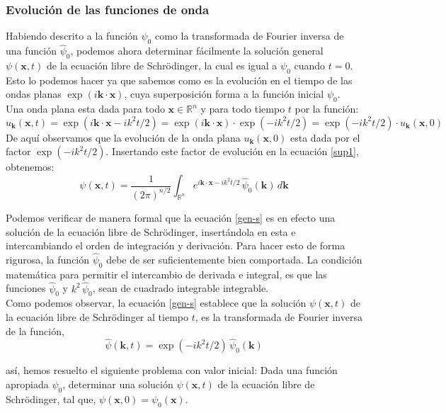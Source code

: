 \documentclass[12pt]{book}
\numberwithin{equation}{chapter}
\def\R{\mathbb{R}}
\def\x{\mathbf{x}}
\def\k{\mathbf{k}}
\begin{document}
\subsubsection{Evoluci\'on de las funciones de onda}
Habiendo descrito a la funci\'on $\psi_{0}$ como la transformada de Fourier inversa de una funci\'on $\hat{\psi}_{0}$, podemos ahora determinar f\'acilmente la soluci\'on general $\psi(\x , t)$ de la ecuaci\'on libre de Schr\"odinger, la cual es igual a $\psi_{0}$ cuando $t=0$. Esto lo podemos hacer ya que sabemos como es la evoluci\'on en el tiempo de las ondas planas $\exp( i \k \cdot \x )$, cuya superposici\'on forma a la funci\'on inicial $\psi_{0}$.\\
Una onda plana esta dada para todo $\x \in \R^{n}$ y para todo tiempo $t$ por la funci\'on:
$$ u_{\k}(\x,t)= \exp ( i \k \cdot \x -i k^{2}t/2  )=\exp(i \k \cdot \x)\cdot \exp(-i k^{2}t/2)= \exp(-i k^{2}t/2)\cdot u_{\k}(\x, 0) $$
De aqu\'i observamos que la evoluci\'on de la onda plana $u_{\k}(\x, 0)$ esta dada por el factor $\exp(-i k^{2}t/2)$. Insertando este factor de evoluci\'on en la ecuaci\'on \eqref{sup1}, obtenemos:
\begin{equation}\label{gen-s}
\psi (\x , t)= \frac{1}{(2 \pi)^{n/2}} \int_{\R^{n}} e^{i\k \cdot \x - ik^{2}t/2}\, \hat{\psi}_{0}(\k)\, d\k
\end{equation}

Podemos verificar de manera formal que la ecuaci\'on \eqref{gen-s} es en efecto una soluci\'on de la ecuaci\'on libre de Schr\"odinger, insert\'andola en esta e intercambiando el orden de integraci\'on y derivaci\'on. Para hacer esto de forma rigurosa, la funci\'on $\hat{\psi}_{0}$ debe de ser suficientemente bien comportada. La condici\'on matem\'atica para permitir el intercambio de derivada e integral, es que las funciones $\hat{\psi}_{0}$ y $ k^{2}\, \hat{\psi}_{0} $, sean de cuadrado integrable integrable.\\

Como podemos observar, la ecuaci\'on \eqref{gen-s} establece que la soluci\'on $\psi(\x,t)$ de la ecuaci\'on libre de Schr\"odinger al tiempo $t$, es la transformada de Fourier inversa de la funci\'on,
\begin{equation}
\hat{\psi}(\k , t)= \exp ( -ik^{2}t/2 )\, \hat{\psi}_{0}(\k)
\end{equation}

as\'i, hemos resuelto el siguiente problema con valor inicial: Dada una funci\'on apropiada $\psi_{0}$, determinar una soluci\'on $\psi (\x ,t)$ de la ecuaci\'on libre de Schr\"odinger, tal que, $ \psi(\x ,0)= \psi_{0}(\x) $.\\
\end{document}
